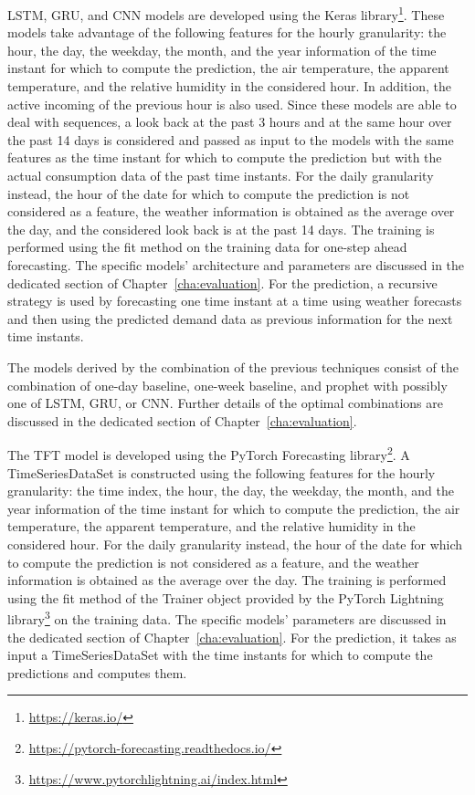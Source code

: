 LSTM, GRU, and CNN models are developed using the Keras library\footnote{ \url{https://keras.io/} }.
These models take advantage of the following features for the hourly granularity: the hour, the day, the weekday, the month, and the year information of the time instant for which to compute the prediction, the air temperature, the apparent temperature, and the relative humidity in the considered hour.
In addition, the active incoming of the previous hour is also used.
Since these models are able to deal with sequences, a look back at the past 3 hours and at the same hour over the past 14 days is considered and passed as input to the models with the same features as the time instant for which to compute the prediction but with the actual consumption data of the past time instants.
For the daily granularity instead, the hour of the date for which to compute the prediction is not considered as a feature, the weather information is obtained as the average over the day, and the considered look back is at the past 14 days.
The training is performed using the fit method on the training data for one-step ahead forecasting.
The specific models' architecture and parameters are discussed in the dedicated section of Chapter~\ref{cha:evaluation}.
For the prediction, a recursive strategy is used by forecasting one time instant at a time using weather forecasts and then using the predicted demand data as previous information for the next time instants.

The models derived by the combination of the previous techniques consist of the combination of one-day baseline, one-week baseline, and prophet with possibly one of LSTM, GRU, or CNN.
Further details of the optimal combinations are discussed in the dedicated section of Chapter~\ref{cha:evaluation}.

The TFT model is developed using the PyTorch Forecasting library\footnote{ \url{https://pytorch-forecasting.readthedocs.io/} }.
A TimeSeriesDataSet is constructed using the following features for the hourly granularity: the time index, the hour, the day, the weekday, the month, and the year information of the time instant for which to compute the prediction, the air temperature, the apparent temperature, and the relative humidity in the considered hour.
For the daily granularity instead, the hour of the date for which to compute the prediction is not considered as a feature, and the weather information is obtained as the average over the day.
The training is performed using the fit method of the Trainer object provided by the PyTorch Lightning library\footnote{ \url{https://www.pytorchlightning.ai/index.html} } on the training data.
The specific models' parameters are discussed in the dedicated section of Chapter~\ref{cha:evaluation}.
For the prediction, it takes as input a TimeSeriesDataSet with the time instants for which to compute the predictions and computes them.

